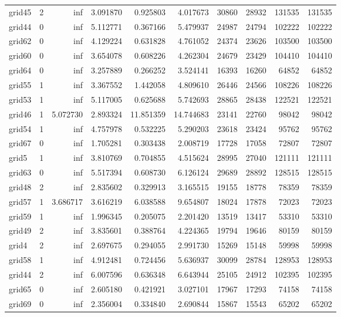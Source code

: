 \begin{longtable}{|l|r|r|r|r|r|r|r|r|r|}
grid45 & 2 & inf & 3.091870 & 0.925803 & 4.017673 & 30860 & 28932 & 131535 & 131535 \\
grid44 & 0 & inf & 5.112771 & 0.367166 & 5.479937 & 24987 & 24794 & 102222 & 102222 \\
grid62 & 0 & inf & 4.129224 & 0.631828 & 4.761052 & 24374 & 23626 & 103500 & 103500 \\
grid60 & 0 & inf & 3.654078 & 0.608226 & 4.262304 & 24679 & 23429 & 104410 & 104410 \\
grid64 & 0 & inf & 3.257889 & 0.266252 & 3.524141 & 16393 & 16260 & 64852 & 64852 \\
grid55 & 1 & inf & 3.367552 & 1.442058 & 4.809610 & 26446 & 24566 & 108226 & 108226 \\
grid53 & 1 & inf & 5.117005 & 0.625688 & 5.742693 & 28865 & 28438 & 122521 & 122521 \\
grid46 & 1 & 5.072730 & 2.893324 & 11.851359 & 14.744683 & 23141 & 22760 & 98042 & 98042 \\
grid54 & 1 & inf & 4.757978 & 0.532225 & 5.290203 & 23618 & 23424 & 95762 & 95762 \\
grid67 & 0 & inf & 1.705281 & 0.303438 & 2.008719 & 17728 & 17058 & 72807 & 72807 \\
grid5 & 1 & inf & 3.810769 & 0.704855 & 4.515624 & 28995 & 27040 & 121111 & 121111 \\
grid63 & 0 & inf & 5.517394 & 0.608730 & 6.126124 & 29689 & 28892 & 128515 & 128515 \\
grid48 & 2 & inf & 2.835602 & 0.329913 & 3.165515 & 19155 & 18778 & 78359 & 78359 \\
grid57 & 1 & 3.686717 & 3.616219 & 6.038588 & 9.654807 & 18024 & 17878 & 72023 & 72023 \\
grid59 & 1 & inf & 1.996345 & 0.205075 & 2.201420 & 13519 & 13417 & 53310 & 53310 \\
grid49 & 2 & inf & 3.835601 & 0.388764 & 4.224365 & 19794 & 19646 & 80159 & 80159 \\
grid4 & 2 & inf & 2.697675 & 0.294055 & 2.991730 & 15269 & 15148 & 59998 & 59998 \\
grid58 & 1 & inf & 4.912481 & 0.724456 & 5.636937 & 30099 & 28784 & 128953 & 128953 \\
grid44 & 2 & inf & 6.007596 & 0.636348 & 6.643944 & 25105 & 24912 & 102395 & 102395 \\
grid65 & 0 & inf & 2.605180 & 0.421921 & 3.027101 & 17967 & 17293 & 74158 & 74158 \\
grid69 & 0 & inf & 2.356004 & 0.334840 & 2.690844 & 15867 & 15543 & 65202 & 65202 \\

\end{longtable}
